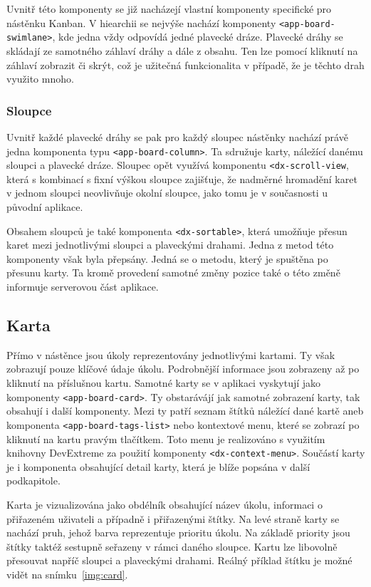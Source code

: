 Uvnitř této komponenty se již nacházejí vlastní komponenty specifické pro nástěnku Kanban. V hiearchii se nejvýše nachází komponenty \texttt{<app-board-swimlane>}, kde jedna vždy odpovídá jedné plavecké dráze. Plavecké dráhy se skládají ze samotného záhlaví dráhy a dále z obsahu. Ten lze pomocí kliknutí na záhlaví zobrazit či skrýt, což je užitečná funkcionalita v případě, že je těchto drah využito mnoho. 

\subsubsection*{Sloupce}

Uvnitř každé plavecké dráhy se pak pro každý sloupec nástěnky nachází právě jedna komponenta typu \texttt{<app-board-column>}. Ta sdružuje karty, náležící danému sloupci a plavecké dráze. Sloupec opět využívá komponentu \texttt{<dx-scroll-view}, která s kombinací s fixní výškou sloupce zajišťuje, že nadměrné hromadění karet v jednom sloupci neovlivňuje okolní sloupce, jako tomu je v současnosti u původní aplikace.

Obsahem sloupců je také komponenta \texttt{<dx-sortable>}, která umožňuje přesun karet mezi jednotlivými sloupci a plaveckými drahami. Jedna z metod této komponenty však byla přepsány. Jedná se o metodu, který je spuštěna po přesunu karty. Ta kromě provedení samotné změny pozice také o této změně informuje serverovou část aplikace. 

\subsection{Karta}
Přímo v nástěnce jsou úkoly reprezentovány jednotlivými kartami. Ty však zobrazují pouze klíčové údaje úkolu. Podrobnější informace jsou zobrazeny až po kliknutí na příslušnou kartu. Samotné karty se v aplikaci vyskytují jako komponenty \texttt{<app-board-card>}. Ty obstarávájí jak samotné zobrazení karty, tak obsahují i další komponenty. Mezi ty patří seznam štítků náležící dané kartě aneb komponenta \texttt{<app-board-tags-list>} nebo kontextové menu, které se zobrazí po kliknutí na kartu pravým tlačítkem. Toto menu je realizováno s využitím knihovny DevExtreme za použití komponenty \texttt{<dx-context-menu>}. Součástí karty je i komponenta obsahující detail karty, která je blíže popsána v další podkapitole.

Karta je vizualizována jako obdélník obsahující název úkolu, informaci o přiřazeném uživateli a případně i přiřazenými štítky. Na levé straně karty se nachází pruh, jehož barva reprezentuje prioritu úkolu. Na základě priority jsou štítky taktéž sestupně seřazeny v rámci daného sloupce. Kartu lze libovolně přesouvat napříč sloupci a plaveckými drahami. Reálný příklad štítku je možné vidět na snímku~\ref{img:card}.

